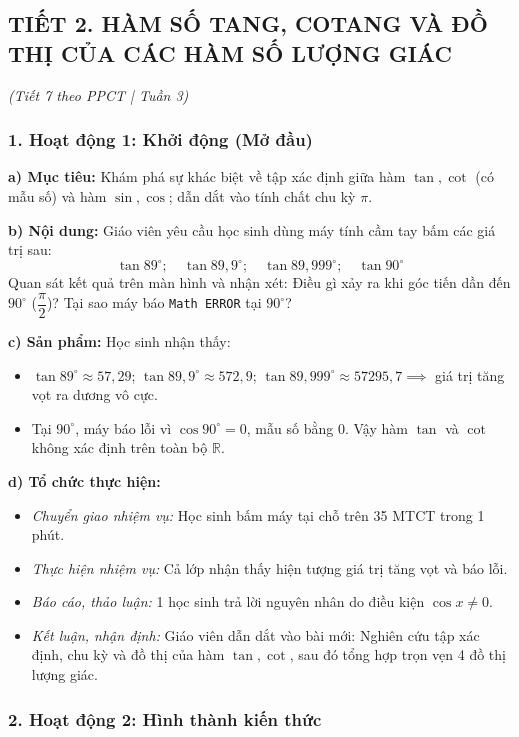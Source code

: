 \documentclass[12pt, a4paper]{article}
\begin{document}
\subsection*{TIẾT 2. HÀM SỐ TANG, COTANG VÀ ĐỒ THỊ CỦA CÁC HÀM SỐ LƯỢNG GIÁC}
\textit{(Tiết 7 theo PPCT | Tuần 3)}

\subsubsection*{1. Hoạt động 1: Khởi động (Mở đầu)}
\textbf{a) Mục tiêu:} Khám phá sự khác biệt về tập xác định giữa hàm $\tan, \cot$ (có mẫu số) và hàm $\sin, \cos$; dẫn dắt vào tính chất chu kỳ $\pi$.

\textbf{b) Nội dung:} Giáo viên yêu cầu học sinh dùng máy tính cầm tay bấm các giá trị sau:
$$\tan 89^\circ; \quad \tan 89{,}9^\circ; \quad \tan 89{,}999^\circ; \quad \tan 90^\circ$$
Quan sát kết quả trên màn hình và nhận xét: Điều gì xảy ra khi góc tiến dần đến $90^\circ$ ($\dfrac{\pi}{2}$)? Tại sao máy báo \texttt{Math ERROR} tại $90^\circ$?

\textbf{c) Sản phẩm:} Học sinh nhận thấy:
\begin{itemize}[leftmargin=0.6cm]
    \item $\tan 89^\circ \approx 57{,}29$; $\tan 89{,}9^\circ \approx 572{,}9$; $\tan 89{,}999^\circ \approx 57295{,}7 \implies$ giá trị tăng vọt ra dương vô cực.
    \item Tại $90^\circ$, máy báo lỗi vì $\cos 90^\circ = 0$, mẫu số bằng 0. Vậy hàm $\tan$ và $\cot$ không xác định trên toàn bộ $\mathbb{R}$.
\end{itemize}

\textbf{d) Tổ chức thực hiện:}
\begin{itemize}[leftmargin=0.6cm]
    \item \textit{Chuyển giao nhiệm vụ:} Học sinh bấm máy tại chỗ trên 35 MTCT trong 1 phút.
    \item \textit{Thực hiện nhiệm vụ:} Cả lớp nhận thấy hiện tượng giá trị tăng vọt và báo lỗi.
    \item \textit{Báo cáo, thảo luận:} 1 học sinh trả lời nguyên nhân do điều kiện $\cos x \neq 0$.
    \item \textit{Kết luận, nhận định:} Giáo viên dẫn dắt vào bài mới: Nghiên cứu tập xác định, chu kỳ và đồ thị của hàm $\tan, \cot$, sau đó tổng hợp trọn vẹn 4 đồ thị lượng giác.
\end{itemize}

\subsubsection*{2. Hoạt động 2: Hình thành kiến thức}
\end{document}
